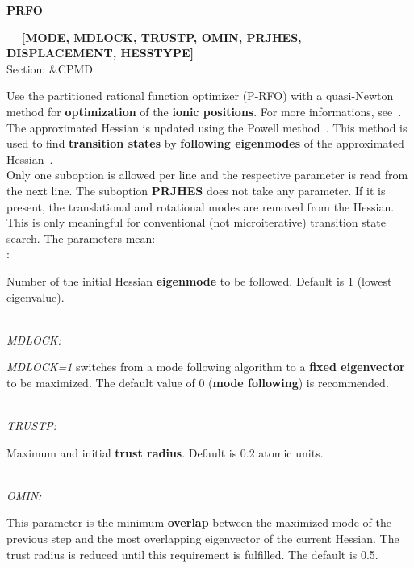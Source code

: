 \documentclass[twoside,10pt,titlepage,a4paper]{article}
\newcommand{\reflabel}[1]{\hypertarget{#1}}
\newcommand{\reflabel}[1]{\label{#1}}
\newcommand{\keyword}[5]{%
\vspace{1.0cm}
\begin{minipage}{15cm}
\reflabel{#1}{\textbf{\large #1}}%
\index{#1}%
\ \textbf{#2}%
\ \textbf{#3}%
\ \textit{#4}%
     \hfill\\\smallskip
     {Section: #5}
     \hfill\\\smallskip\vskip 10pt
\end{minipage}
}%
\newcommand{\desc}[1]{%
   \hspace*{\fill} \parbox{130mm}{\sloppy
                          {#1}%
                             }
     \hfill\\\smallskip
   }%
\newcommand{\desc}[1]{#1\vspace{1ex}}
\begin{document}
\keyword{PRFO}{}{[MODE, MDLOCK, TRUSTP, OMIN, PRJHES, DISPLACEMENT, HESSTYPE]}{}{\&CPMD}
  \desc{Use the partitioned rational function optimizer (P-RFO) with a quasi-Newton
      method  for {\bf optimization} of the {\bf ionic positions}. For more
      informations, see~\cite{LSCAL}. The approximated Hessian is updated
      using the Powell method~\cite{Powell71}.
      This method is used to find {\bf transition states} by
      {\bf following eigenmodes} of the approximated
      Hessian~\cite{Banerjee85,LSCAL}.\\
      Only one suboption is allowed per line and the respective parameter
      is read from the next line. The suboption {\bf PRJHES} does not take any
      parameter. If it is present, the translational and rotational modes are
      removed from the Hessian. This is only meaningful for conventional (not
      microiterative) transition state search. The parameters mean:\\
      \hfill\smallskip {\sl MODE}:
                       \hfill\begin{minipage}[t]{9.6cm}
                       Number of the initial Hessian {\bf eigenmode} to be
                       followed. Default is 1 (lowest eigenvalue).
                       \end{minipage}\\
      {\sl MDLOCK:} \hfill\begin{minipage}[t]{9.6cm}
                       {\sl MDLOCK=1} switches from a mode following algorithm
                       to a {\bf fixed eigenvector} to be maximized.
                       The default value of 0 ({\bf mode following}) is
                       recommended.
                      \end{minipage}\\
      {\sl TRUSTP:} \hfill\begin{minipage}[t]{9.6cm}
                       Maximum and initial {\bf trust radius}.
                       Default is 0.2 atomic units.
                                      \end{minipage}\\
      {\sl OMIN:} \hfill\begin{minipage}[t]{9.6cm}
                       This parameter is the minimum {\bf overlap} between the
                       maximized mode of the previous step and the most
                       overlapping eigenvector of the current Hessian.
                       The trust radius is reduced until this requirement is
                       fulfilled. The default is 0.5.

\end{minipage}}
\end{document}
